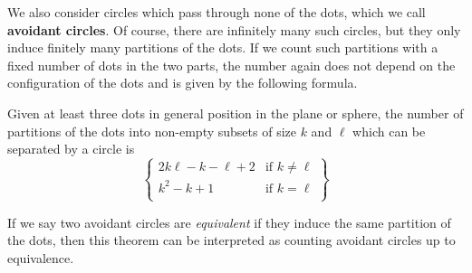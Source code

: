 \documentclass[11pt,oneside]{amsart}
\newenvironment{rethm}[1]
  {\renewcommand\theinnercustomthm{#1}\innercustomthm}
  {\endinnercustomthm}
\theoremstyle{definition}
\theoremstyle{remark}
\numberwithin{equation}{section}
\begin{document}

We also consider circles which pass through none of the dots, which we call \textbf{avoidant circles}. Of course, there are infinitely many such circles, but they only induce finitely many partitions of the dots. 
If we count such partitions with a fixed number of dots in the two parts, the number again does not depend on the configuration of the dots and is given by the following formula. 

\begin{rethm}{B}\label{thm: avoidant}
Given at least three dots in general position in the plane or sphere, the number of partitions of the dots into non-empty subsets of size $k$ and $\ell$ which can be separated by a circle is
    \[
    \left\{
    \begin{array}{cc}
    2k \ell - k - \ell + 2 &\text{if $k\neq \ell$} \\
    k^2 - k + 1 &\text{if $k= \ell$} \\
    \end{array}
    \right\}
    \]
\end{rethm}

\noindent If we say two avoidant circles are \emph{equivalent} if they induce the same partition of the dots, then this theorem can be interpreted as counting avoidant circles up to equivalence.

\end{document}
